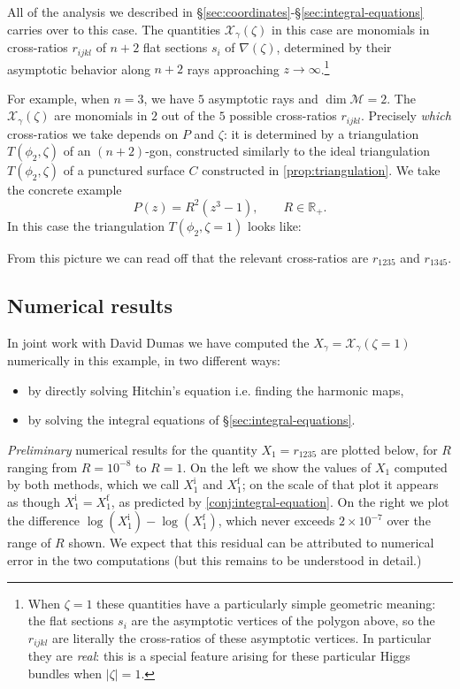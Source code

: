 \documentclass[12pt,letterpaper,reqno]{article}
\numberwithin{equation}{section}
\newcommand{\cM}{\ensuremath{\mathcal M}}
\newcommand{\cX}{\ensuremath{\mathcal X}}
\newcommand{\R}{\ensuremath{\mathbb R}}
\newcommand{\abs}[1]{\lvert#1\rvert}
\newcommand{\ti}[1]{\textit{#1}}
\newcommand{\insfig}[2]{

\medskip
\noindent
\begin{minipage}{\linewidth}

\makebox[\linewidth]{\texttt{[image: figures/\#1-crop.pdf]}}

\end{minipage}
\medskip

}
\begin{document}
All of the analysis we described in
\S\ref{sec:coordinates}-\S\ref{sec:integral-equations}
carries over to this case.
The quantities $\cX_\gamma(\zeta)$ in this case are monomials in cross-ratios $r_{ijkl}$ of $n+2$ flat sections $s_i$
of $\nabla(\zeta)$,
determined by their asymptotic behavior along $n+2$ rays
approaching $z \to \infty$.\footnote{When $\zeta = 1$ these quantities have
a particularly simple geometric meaning: the flat sections
$s_i$ are the asymptotic vertices of the
polygon above, so the $r_{ijkl}$ are literally
the cross-ratios of these asymptotic vertices.
In particular they are \ti{real}: this is a special feature
arising for these particular Higgs bundles when 
$\abs{\zeta}=1$.}

For example, when $n=3$, we have $5$ asymptotic rays and $\dim \cM = 2$. The $\cX_\gamma(\zeta)$ are monomials in
$2$ out of the $5$ possible cross-ratios $r_{ijkl}$. 
Precisely \ti{which} cross-ratios we take depends on $P$ and $\zeta$:
it is determined by a triangulation $T(\phi_2, \zeta)$ 
of an $(n+2)$-gon, constructed similarly to the
ideal triangulation $T(\phi_2, \zeta)$ of a punctured surface 
$C$ constructed in \autoref{prop:triangulation}.
We take the concrete example
\begin{equation}
  P(z) = R^2 (z^3 - 1), \qquad R \in \R_+.
\end{equation}
In this case the triangulation $T(\phi_2, \zeta = 1)$ looks
like:
\insfig{higgs-metric-16}{0.8}
From this picture we can read off that the 
relevant cross-ratios are $r_{1235}$ and $r_{1345}$.

\subsection{Numerical results}

In joint work with David Dumas we 
have computed the $X_\gamma = \cX_\gamma(\zeta = 1)$ numerically
in this example, in two different ways: 
\begin{itemize}
\item by
directly solving Hitchin's equation i.e. finding
the harmonic maps,
\item
by solving the integral equations of \S\ref{sec:integral-equations}.
\end{itemize}
\ti{Preliminary} numerical results for
the quantity $X_1 = r_{1235}$ are plotted below, for $R$ ranging
from $R = 10^{-8}$ to $R = 1$. On the left we show 
the values of $X_1$ computed by both methods, which we call
 $X_1^{\mathrm i}$ and $X_1^{\mathrm f}$; on the scale of that
plot it appears as though $X_1^{\mathrm i} = X_1^{\mathrm f}$,
as predicted by \autoref{conj:integral-equation}.
On the right we plot the difference
$\log(X_1^{\mathrm i}) - \log(X_1^{\mathrm f})$, 
which never exceeds $2 \times 10^{-7}$ over the range of $R$ shown.
We expect that this residual can be attributed to 
numerical error in the two computations (but this remains to be 
understood in detail.)
\end{document}
